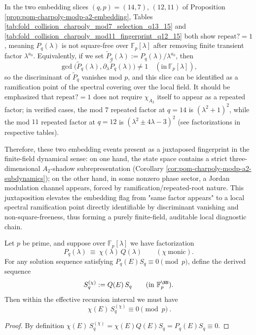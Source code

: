 \begin{remark}\label{rem:pom-a2-embedding-local-ramification}
In the two embedding slices \((q,p)=(14,7)\), \((12,11)\) of Proposition \ref{prop:pom-charpoly-modp-a2-embedding}, Tables \ref{tab:fold_collision_charpoly_mod7_selection_q13_15} and \ref{tab:fold_collision_charpoly_mod11_fingerprint_q12_15} both show \(\mathrm{repeat?}=1\), meaning \(P_q(\lambda)\) is not square-free over \(\mathbb{F}_p[\lambda]\) after removing finite transient factor \(\lambda^{a_0}\).
Equivalently, if we set \(\widetilde P_q(\lambda):=P_q(\lambda)/\lambda^{a_0}\), then
\[
\gcd\!\bigl(\widetilde P_q(\lambda),\partial_\lambda \widetilde P_q(\lambda)\bigr)\neq 1\quad(\mathrm{in}\ \mathbb{F}_p[\lambda]),
\]
so the discriminant of \(\widetilde P_q\) vanishes mod \(p\), and this slice can be identified as a ramification point of the spectral covering over the local field.
It should be emphasized that \(\mathrm{repeat?}=1\) does not require \(\chi_{A_2}\) itself to appear as a repeated factor; in verified cases, the mod \(7\) repeated factor at \(q=14\) is \((\lambda^2+1)^2\), while the mod \(11\) repeated factor at \(q=12\) is \((\lambda^2\pm 4\lambda-3)^2\) (see factorizations in respective tables).
\par
Therefore, these two embedding events present as a juxtaposed fingerprint in the finite-field dynamical sense: on one hand, the state space contains a strict three-dimensional \(A_2\)-shadow subrepresentation (Corollary \ref{cor:pom-charpoly-modp-a2-subdynamics}); on the other hand, in some nonzero phase sector, a Jordan modulation channel appears, forced by ramification/repeated-root nature.
This juxtaposition elevates the embedding flag from "same factor appears" to a local spectral ramification point directly identifiable by discriminant vanishing and non-square-freeness, thus forming a purely finite-field, auditable local diagnostic chain.
\end{remark}

\begin{proposition}\label{prop:pom-modp-factor-extraction}
Let \(p\) be prime, and suppose over \(\mathbb{F}_p[\lambda]\) we have factorization
\[
P_q(\lambda)\ \equiv\ \chi(\lambda)\,Q(\lambda)\qquad(\chi\ \text{monic}).
\]
For any solution sequence satisfying \(P_q(E)S_q\equiv 0\pmod p\), define the derived sequence
\[
S_q^{(\chi)}:=Q(E)\,S_q\qquad(\mathrm{in}\ \mathbb{F}_p^{\NN}).
\]
Then within the effective recursion interval we must have
\[
\boxed{\ \chi(E)\,S_q^{(\chi)}\equiv 0\pmod p\ }.
\]
\end{proposition}
\begin{proof}
By definition
\(
\chi(E)\,S_q^{(\chi)}=\chi(E)Q(E)S_q=P_q(E)S_q\equiv 0
\).
\end{proof}

